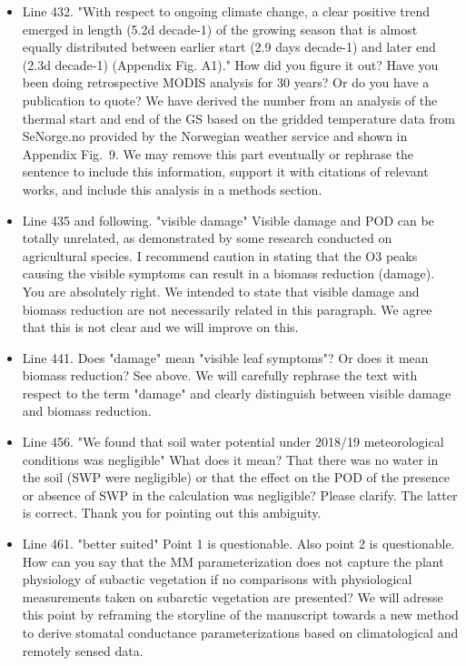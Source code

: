 \documentclass{scrartcl}
\begin{document}
\begin{itemize}
\item {\color{blue}Line 432. "With respect to ongoing climate change, a clear positive trend emerged in length (5.2d decade-1) of the growing season that is almost equally distributed between earlier start (2.9 days decade-1) and later end (2.3d decade-1) (Appendix Fig. A1)." How did you figure it out? Have you been doing retrospective MODIS analysis for 30 years? Or do you have a publication to quote?}
We have derived the number from an analysis of the thermal start and end of the GS based on the gridded temperature data from SeNorge.no provided by the Norwegian weather service and shown in Appendix Fig.~9. We may remove this part eventually or rephrase the sentence to include this information, support it with citations of relevant works, and include this analysis in a methods section.

\item {\color{blue}Line 435 and following. "visible damage"
Visible damage and POD can be totally unrelated, as demonstrated by some research
conducted on agricultural species. I recommend caution in stating that the O3 peaks
causing the visible symptoms can result in a biomass reduction (damage).}
You are absolutely right. We intended to state that visible damage and biomass reduction are not necessarily related in this paragraph. We agree that this is not clear and we will improve on this.

\item {\color{blue}Line 441. Does "damage" mean "visible leaf symptoms"? Or does it mean biomass reduction?}
See above. We will carefully rephrase the text with respect to the term "damage" and clearly distinguish between visible damage and biomass reduction.

\item {\color{blue}Line 456. "We found that soil water potential under 2018/19 meteorological conditions was negligible" What does it mean? That there was no water in the soil (SWP were negligible) or that the effect on the POD of the presence or absence of SWP in the calculation was negligible? Please clarify.}
The latter is correct. Thank you for pointing out this ambiguity.

\item {\color{blue}Line 461. "better suited" Point 1 is questionable.
Also point 2 is questionable. How can you say that the MM parameterization does not
capture the plant physiology of subactic vegetation if no comparisons with physiological measurements taken on subarctic vegetation are presented?}
We will adresse this point by reframing the storyline of the manuscript towards a new method to derive stomatal conductance parameterizations based on climatological and remotely sensed data. 


\end{itemize}
\end{document}
